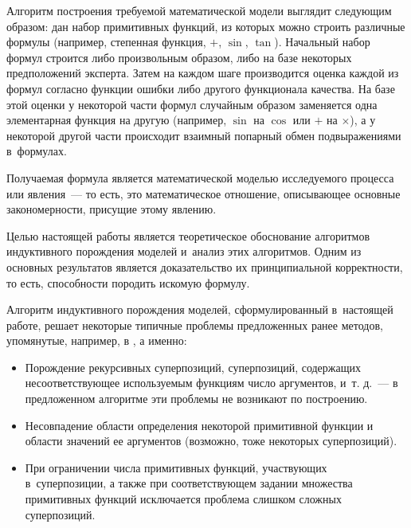 \documentclass[12pt,a4paper]{article}
\begin{document}
Алгоритм построения требуемой математической модели выглядит следующим образом:
дан набор примитивных функций, из которых можно строить различные формулы
(например, степенная функция, $+$, $\sin$, $\tan$). Начальный набор формул
строится либо произвольным образом, либо на базе некоторых предположений
эксперта. Затем на каждом шаге производится оценка каждой из формул согласно
функции ошибки либо другого функционала \cite{Tirsin2005} качества. На базе
этой оценки у некоторой части формул случайным образом заменяется одна
элементарная функция на другую (например, $\sin$ на $\cos$ или $+$ на
$\times$), а у некоторой другой части происходит взаимный попарный обмен
подвыражениями в~формулах.

Получаемая формула является математической моделью \cite{Pavlovsky2000}
исследуемого процесса или явления~--- то есть, это математическое отношение,
описывающее основные закономерности, присущие этому явлению.


Целью настоящей работы является теоретическое обоснование алгоритмов индуктивного
порождения моделей и~анализ этих алгоритмов. Одним из основных результатов
является доказательство их принципиальной корректности, то есть, способности
породить искомую формулу.

Алгоритм индуктивного порождения моделей, сформулированный в~настоящей работе, решает
некоторые типичные проблемы предложенных ранее методов, упомянутые, например,
в \cite{Zelinka2008}, а именно:
\begin{itemize}
  \item Порождение рекурсивных суперпозиций, суперпозиций, содержащих
	несоответствующее используемым функциям число аргументов, и~т. д.~--- в
	предложенном алгоритме эти проблемы не возникают по построению.
  \item Несовпадение области определения некоторой примитивной функции и области
	значений ее аргументов (возможно, тоже некоторых суперпозиций).
  \item При ограничении числа примитивных функций, участвующих в~суперпозиции,
	а также при соответствующем задании множества примитивных функций
	исключается проблема слишком сложных суперпозиций.
\end{itemize}
\end{document}
